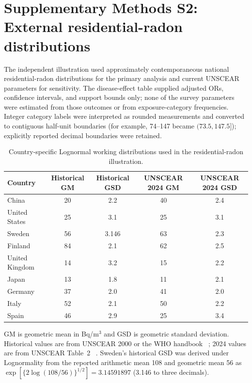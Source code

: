 \documentclass[11pt]{article}
\begin{document}
\section*{Supplementary Methods S2: External residential-radon distributions}

The independent illustration used approximately contemporaneous national
residential-radon distributions for the primary analysis and current UNSCEAR
parameters for sensitivity. The disease-effect table supplied adjusted ORs,
confidence intervals, and support bounds only; none of the survey parameters
were estimated from those outcomes or from exposure-category frequencies.
Integer category labels were interpreted as rounded measurements and converted
to contiguous half-unit boundaries (for example, 74--147 became
$(73.5,147.5]$); explicitly reported decimal boundaries were retained.

\begin{table}[htbp]
\centering
\caption{Country-specific Lognormal working distributions used in the residential-radon illustration.}
\label{tab:supp_radon_dist}
\small
\begin{tabular}{lcccc}
\toprule
Country & Historical GM & Historical GSD & UNSCEAR 2024 GM & UNSCEAR 2024 GSD \\
\midrule
China & 20 & 2.2 & 40 & 2.4 \\
United States & 25 & 3.1 & 25 & 3.1 \\
Sweden & 56 & 3.146 & 63 & 2.3 \\
Finland & 84 & 2.1 & 62 & 2.5 \\
United Kingdom & 14 & 3.2 & 15 & 2.2 \\
Japan & 13 & 1.8 & 11 & 2.1 \\
Germany & 37 & 2.0 & 41 & 2.0 \\
Italy & 52 & 2.1 & 50 & 2.2 \\
Spain & 46 & 2.9 & 25 & 3.4 \\
\bottomrule
\end{tabular}
\par\smallskip
\begin{minipage}{0.92\textwidth}
\footnotesize GM is geometric mean in Bq/m$^3$ and GSD is geometric standard
deviation. Historical values are from UNSCEAR 2000 or the WHO handbook
~\cite{UNSCEAR2000,WHO2009Radon}; 2024 values are from UNSCEAR Table~2
~\cite{UNSCEAR2024}. Sweden's historical GSD was derived under Lognormality
from the reported arithmetic mean 108 and geometric mean 56 as
$\exp[\{2\log(108/56)\}^{1/2}]=3.14591897$ (3.146 to three decimals).
\end{minipage}
\end{table}
\end{document}

